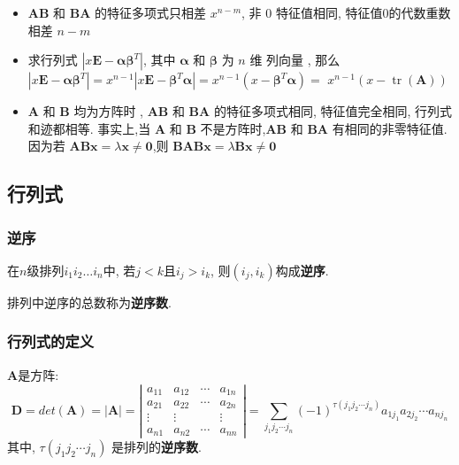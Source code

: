 \documentclass{article}
\begin{document}
				\begin{itemize}
					\item $\boldsymbol A \boldsymbol B$ 和 $\boldsymbol B \boldsymbol A$ 的特征多项式只相差 $x^{n-m}$, 非 0 特征值相同, 特征值0的代数重数相差 $n-m$
					\item 求行列式 $\left|x \boldsymbol E-\boldsymbol \alpha \boldsymbol \beta^{T}\right|$, 其中 $\boldsymbol \alpha$ 和 $ \boldsymbol \beta$ 为 $n$ 维 列向量 , 那么 $\left|x \boldsymbol E-\boldsymbol \alpha \boldsymbol \beta^{T}\right|=x^{n-1}\left|x \boldsymbol E- \boldsymbol \beta^{T} \boldsymbol \alpha\right|=x^{n-1}\left(x- \boldsymbol \beta^{T} \boldsymbol \alpha\right)=$ $x^{n-1}(x-\operatorname{tr}(\boldsymbol A))$
					\item $\boldsymbol A$ 和 $\boldsymbol B$ 均为方阵时 , $\boldsymbol A \boldsymbol B$ 和 $\boldsymbol B \boldsymbol A$ 的特征多项式相同, 特征值完全相同, 行列式和迹都相等. 事实上,当 $\boldsymbol A$ 和 $\boldsymbol B$ 不是方阵时,$\boldsymbol A \boldsymbol B$ 和 $\boldsymbol B \boldsymbol A$ 有相同的非零特征值. 因为若 $\boldsymbol A \boldsymbol B \boldsymbol x = \lambda \boldsymbol x \neq \boldsymbol 0$,则 $\boldsymbol B \boldsymbol A \boldsymbol B \boldsymbol x = \lambda \boldsymbol B \boldsymbol x \neq \boldsymbol 0$
				\end{itemize}
		\subsection{行列式}
			\subsubsection{逆序}
				在$n$级排列$i_1i_2\dots i_n$中, 若$j<k$且$i_j>i_k$, 则$(i_j,i_k)$构成\textbf{逆序}.

				排列中逆序的总数称为\textbf{逆序数}.
			\subsubsection{行列式的定义}
				$\boldsymbol{A}$是方阵:
				$$
				\boldsymbol{D}=det\left(\boldsymbol{A}\right)=|\boldsymbol{A}|=
				\left|\begin{array}{cccc}
					a_{11} & a_{12} & \cdots & a_{1 n} \\
					a_{21} & a_{22} & \cdots & a_{2 n} \\
					\vdots & \vdots & & \vdots \\
					a_{n 1} & a_{n 2} & \cdots & a_{n n}
				\end{array}\right|=
				\sum_{j_{1} j_{2} \cdots j_{n}}(-1)^{\tau\left(j_{1} j_{2} \cdots j_{n}\right)} a_{1 j_{1}} a_{2 j_{2}} \cdots a_{n j_{n}}
				$$
				其中, $\tau\left(j_{1} j_{2} \cdots j_{n}\right)$ 是排列的\textbf{逆序数}.
\end{document}
